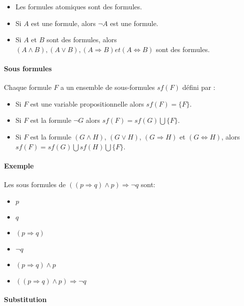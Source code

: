 \documentclass[11pt,twoside,openright,a4paper]{report}
\begin{document}
\begin{itemize}
	\item Les formules atomiques sont des formules.
	\item Si $A$ est une formule, alors $\neg A$ est une formule.
	\item Si $A$ et $B$ sont des formules, alors $(A \land B), (A \lor B), (A \Rightarrow B) et (A \Leftrightarrow B)$ sont des formules.		
\end{itemize}


\paragraph{Sous formules} %
\label{par:sous_formules}

Chaque formule $F$ a un ensemble de sous-formules $sf(F)$ défini par :

\begin{itemize}
	\item Si $F$ est une variable propositionnelle alors $sf(F) = \{F\}$.
	\item Si $F$ est la formule $\neg G$ alors $sf(F) = sf(G) \bigcup \{F\}$.
	\item Si $F$ est la formule $(G \land H)$, $(G \lor H)$, $(G \Rightarrow H)$ et $(G \Leftrightarrow H)$, alors $sf(F) = sf(G) \bigcup sf(H) \bigcup \{F\}$.
\end{itemize}


\paragraph{Exemple} %
\label{par:exemple}
Les sous formules de $(( p \Rightarrow q ) \land p ) \Rightarrow \neg q$ sont:

\begin{itemize}
	\item $p$
	\item $q$
	\item $(p \Rightarrow q)$
	\item $\neg q$
	\item $( p \Rightarrow q ) \land p$
	\item $(( p \Rightarrow q ) \land p ) \Rightarrow \neg q$
\end{itemize}


\paragraph{Substitution} %
\label{par:substitution}
\end{document}
